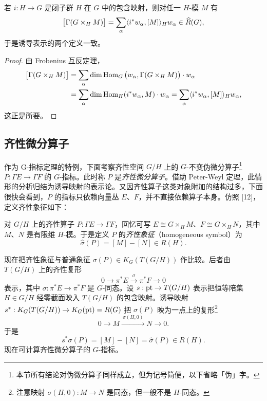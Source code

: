 \begin{corollary}
若 $i:H\to G$ 是闭子群 $H$ 在 $G$ 中的包含映射，则对任一 $H$-模 $M$ 有
\[
\big[\Gamma(G\times_H M)\big]=\sum_\alpha\langle i^*w_\alpha,[M]\rangle_H w_\alpha\in\widehat R(G),
\]
于是诱导表示的两个定义一致。
\end{corollary}

\begin{proof}
由 Frobenius 互反定理，
\[
\begin{aligned}
\big[\Gamma(G\times_H M)\big]
&=\sum_\alpha\dim\operatorname{Hom}_G\big(w_\alpha,\Gamma(G\times_H M)\big)\cdot w_\alpha\\
&=\sum_\alpha\dim\operatorname{Hom}_H(i^*w_\alpha,M)\cdot w_\alpha
=\sum_\alpha\langle i^*w_\alpha,[M]\rangle_H w_\alpha,
\end{aligned}
\]
这正是所要。
\end{proof}

\subsection{齐性微分算子}

作为 G-指标定理的特例，下面考察齐性空间 $G/H$ 上的 $G$-不变伪微分算子\footnote{本节所有结论对伪微分算子同样成立，但为记号简便，以下省略「伪」字。} $P:\Gamma E\to\Gamma F$ 的 $G$-指标。此时称 $P$ 是\emph{齐性微分算子}。借助 Peter-Weyl 定理，此情形的分析归结为诱导映射的表示论。又因齐性算子这类对象附加的结构过多，下面很快会看到，$P$ 的指标只依赖向量丛 $E$、$F$，并不直接依赖算子本身。仿照 [12]，定义齐性象征如下：

\begin{definition}
对 $G/H$ 上的齐性算子 $P:\Gamma E\to\Gamma F$，回忆可写 $E\cong G\times_H M$、$F\cong G\times_H N$，其中 $M$、$N$ 是有限维 $H$-模。于是定义 $P$ 的\emph{齐性象征}（homogeneous symbol）为
\[
\hat\sigma(P)=[M]-[N]\in R(H).
\]
\end{definition}

现在把齐性象征与普通象征 $\sigma(P)\in K_G(T(G/H))$ 作比较。后者由 $T(G/H)$ 上的齐性复形
\[
0\longrightarrow\pi^*E\xrightarrow{\ \sigma\ }\pi^*F\longrightarrow 0
\]
表示，其中 $\sigma:\pi^*E\to\pi^*F$ 是 $G$-同态。设 $s:\mathrm{pt}\to T(G/H)$ 表示把恒等陪集 $H\in G/H$ 经零截面映入 $T(G/H)$ 的包含映射。诱导映射 $s^*:K_G(T(G/H))\to K_G(\mathrm{pt})=R(G)$ 把 $\sigma(P)$ 映为一点上的复形\footnote{注意映射 $\sigma(H,0):M\to N$ 是同态，但一般不是 $H$-同态。}
\[
0\longrightarrow M\xrightarrow{\ \sigma(H,0)\ }N\longrightarrow 0.
\]
于是
\[
s^*\sigma(P)=[M]-[N]=\hat\sigma(P)\in R(H).
\]
现在可计算齐性微分算子的 $G$-指标。

